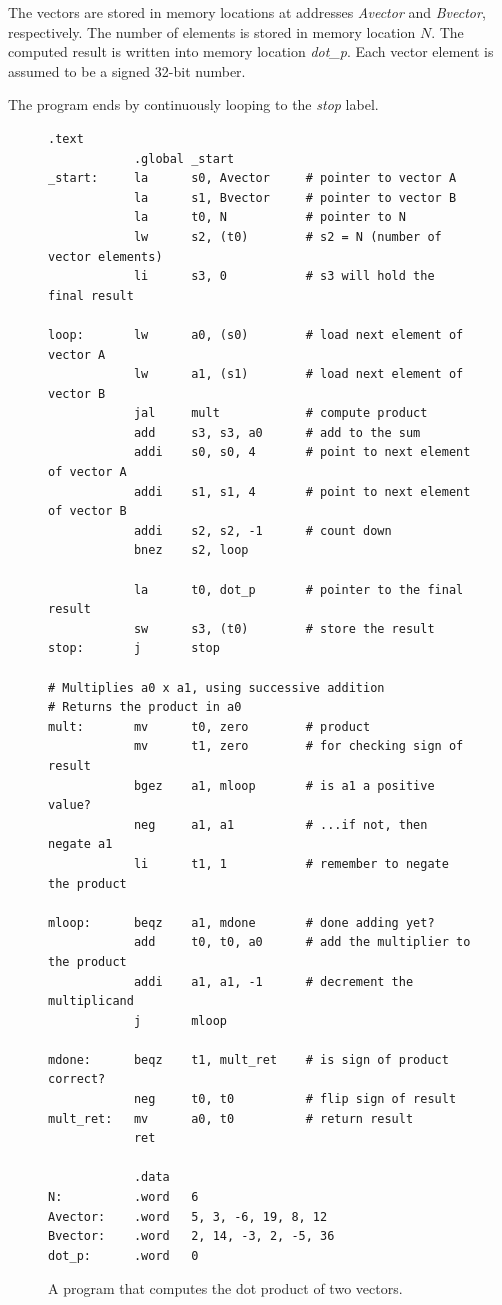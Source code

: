 \documentclass[11pt, twoside, pdftex]{article}
\begin{document}
\noindent
The vectors are stored in memory locations at addresses
{\it Avector} and {\it Bvector}, respectively. The number of elements
is stored in memory location $N$. The computed result is written
into memory location {\it dot\_p}. Each vector element is assumed to be a
signed 32-bit number.

\noindent
The program ends by continuously looping to the {\it stop} label.

\begin{figure}[H]
\begin{lstlisting}[style=defaultNiosVStyle]
            .text
            .global _start
_start:     la      s0, Avector     # pointer to vector A
            la      s1, Bvector     # pointer to vector B
            la      t0, N           # pointer to N
            lw      s2, (t0)        # s2 = N (number of vector elements)
            li      s3, 0           # s3 will hold the final result
            
loop:       lw      a0, (s0)        # load next element of vector A
            lw      a1, (s1)        # load next element of vector B
            jal     mult            # compute product
            add     s3, s3, a0      # add to the sum
            addi    s0, s0, 4       # point to next element of vector A
            addi    s1, s1, 4       # point to next element of vector B
            addi    s2, s2, -1      # count down
            bnez    s2, loop

            la      t0, dot_p       # pointer to the final result
            sw      s3, (t0)        # store the result
stop:       j       stop

# Multiplies a0 x a1, using successive addition
# Returns the product in a0
mult:       mv      t0, zero        # product
            mv      t1, zero        # for checking sign of result
            bgez    a1, mloop       # is a1 a positive value?
            neg     a1, a1          # ...if not, then negate a1
            li      t1, 1           # remember to negate the product

mloop:      beqz    a1, mdone       # done adding yet?
            add     t0, t0, a0      # add the multiplier to the product
            addi    a1, a1, -1      # decrement the multiplicand
            j       mloop

mdone:      beqz    t1, mult_ret    # is sign of product correct?
            neg     t0, t0          # flip sign of result
mult_ret:   mv      a0, t0          # return result
            ret

            .data
N:          .word   6
Avector:    .word   5, 3, -6, 19, 8, 12
Bvector:    .word   2, 14, -3, 2, -5, 36
dot_p:      .word   0
\end{lstlisting}
	\caption{A program that computes the dot product of two vectors.}
	\label{fig:example}
\end{figure}
\end{document}
